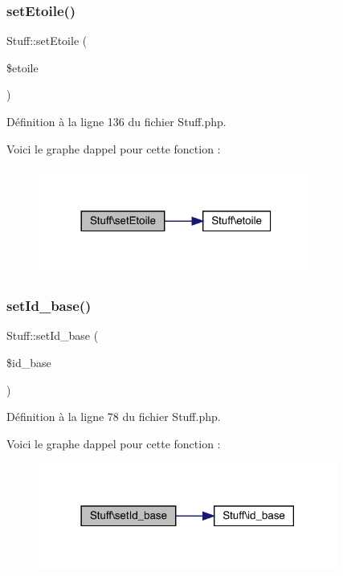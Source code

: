 \subsubsection{\texorpdfstring{set\+Etoile()}{setEtoile()}}
{\footnotesize\ttfamily Stuff\+::set\+Etoile (\begin{DoxyParamCaption}\item[{}]{\$etoile }\end{DoxyParamCaption})}



Définition à la ligne 136 du fichier Stuff.\+php.

Voici le graphe d\textquotesingle{}appel pour cette fonction \+:\nopagebreak
\begin{figure}[H]
\begin{center}
\leavevmode
\includegraphics[width=257pt]{class_stuff_a71d02dca0478b89b261d94cc53cde5de_cgraph}
\end{center}
\end{figure}
\mbox{\label{class_stuff_a47eed0620503b4e4aba2b445531b598a}} 
\subsubsection{\texorpdfstring{set\+Id\+\_\+base()}{setId\_base()}}
{\footnotesize\ttfamily Stuff\+::set\+Id\+\_\+base (\begin{DoxyParamCaption}\item[{}]{\$id\+\_\+base }\end{DoxyParamCaption})}



Définition à la ligne 78 du fichier Stuff.\+php.

Voici le graphe d\textquotesingle{}appel pour cette fonction \+:\nopagebreak
\begin{figure}[H]
\begin{center}
\leavevmode
\includegraphics[width=278pt]{class_stuff_a47eed0620503b4e4aba2b445531b598a_cgraph}
\end{center}
\end{figure}
\mbox{\label{class_stuff_ab06c44c241a0322978a44dffabac731d}} 
